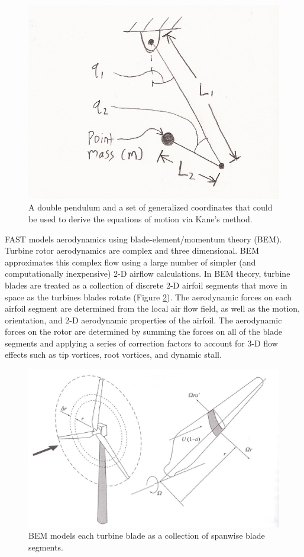 \begin{figure}[ht]
	\centering
		\includegraphics[width=.5\linewidth]{Figures/AppendixAFigures/figA-2.png}
	\caption{A double pendulum and a set of generalized coordinates that could be used to derive the equations of motion via Kane's method.}
	\label{figA-2}
\end{figure}


FAST models aerodynamics using blade-element/momentum theory (BEM). Turbine rotor aerodynamics are complex and three dimensional. BEM approximates this complex flow using a large number of simpler (and computationally inexpensive) 2-D airflow calculations. In BEM theory, turbine blades are treated as a collection of discrete 2-D airfoil segments that move in space as the turbines blades rotate (Figure \ref{figA-3}). The aerodynamic forces on each airfoil segment are determined from the local air flow field, as well as the motion, orientation, and 2-D aerodynamic properties of the airfoil. The aerodynamic forces on the rotor are determined by summing the forces on all of the blade segments and applying a series of correction factors to account for 3-D flow effects such as tip vortices, root vortices, and dynamic stall. 

\begin{figure}[ht]
	\centering
		\includegraphics[width=.75\linewidth]{Figures/AppendixAFigures/figA-3.png}
	\caption{BEM models each turbine blade as a collection of spanwise blade segments.\cite{burton2011}}
	\label{figA-3}
\end{figure}

